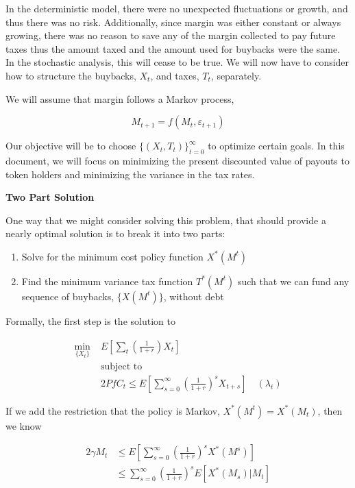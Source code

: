 
In the deterministic model, there were no unexpected fluctuations or growth, and thus there was no
risk. Additionally, since margin was either constant or always growing, there was no reason to save
any of the margin collected to pay future taxes thus the amount taxed and the amount used for
buybacks were the same. In the stochastic analysis, this will cease to be true. We will now have to
consider how to structure the buybacks, $X_t$, and taxes, $T_t$, separately.

We will assume that margin follows a Markov process,

$$M_{t+1} = f(M_t, \varepsilon_{t+1})$$

Our objective will be to choose $\{(X_t, T_t)\}_{t=0}^{\infty}$ to optimize certain goals. In this
document, we will focus on minimizing the present discounted value of payouts to token holders and
minimizing the variance in the tax rates.

\textbf{Two Part Solution}

One way that we might consider solving this problem, that should provide a nearly optimal solution
is to break it into two parts:

\begin{enumerate}
  \item Solve for the minimum cost policy function $X^*(M^t)$
  \item Find the minimum variance tax function $T^*(M^t)$ such that we can fund any sequence of
        buybacks, $\{X(M^t)\}$, without debt
\end{enumerate}

Formally, the first step is the solution to

\begin{align*}
  \min_{\{X_t\}} \; & E \left[ \sum_{t} \left(\frac{1}{1 + r} \right) X_t \right] \\
  &\text{subject to} \\
  \quad & 2 PfC_t \leq E \left[ \sum_{s=0}^{\infty} \left(\frac{1}{1 + r}\right)^s X_{t+s} \right] \quad (\lambda_t)
\end{align*}

If we add the restriction that the policy is Markov, $X^*(M^t) = X^*(M_t)$, then we know

\begin{align*}
  2 \gamma M_t &\leq E \left[ \sum_{s=0}^{\infty} \left( \frac{1}{1+r} \right)^s X^*(M^s) \right] \\
  &\leq \sum_{s=0}^{\infty} \left( \frac{1}{1+r} \right)^s E \left[X^*(M_s) | M_t \right]
\end{align*}

